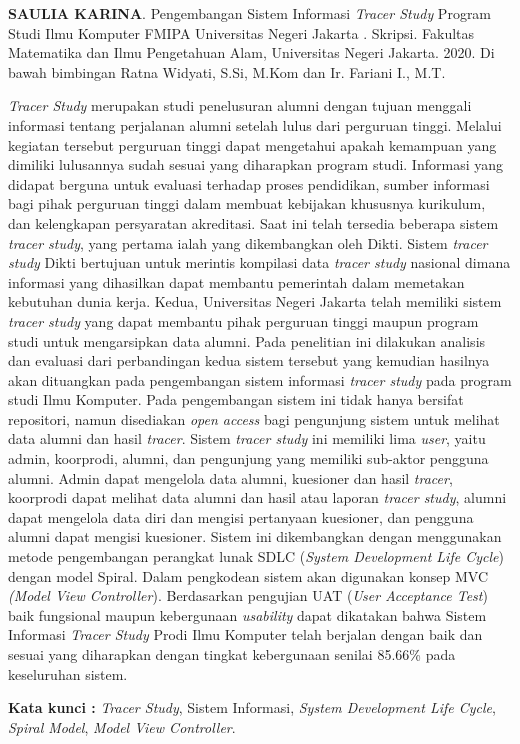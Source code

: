 \documentclass{jtetiskripsi}
\begin{document}
\begin{abstractind}
\textbf{SAULIA KARINA}. Pengembangan Sistem Informasi \textit{Tracer Study} Program Studi Ilmu Komputer FMIPA Universitas Negeri Jakarta . Skripsi. Fakultas Matematika dan Ilmu Pengetahuan Alam, Universitas Negeri Jakarta. 2020. Di bawah bimbingan Ratna Widyati, S.Si, M.Kom dan Ir. Fariani I., M.T.
\vskip1cm

\textit{Tracer Study} merupakan studi penelusuran alumni dengan tujuan menggali informasi tentang perjalanan alumni setelah lulus dari perguruan tinggi. Melalui kegiatan tersebut perguruan tinggi dapat mengetahui apakah kemampuan yang dimiliki lulusannya sudah sesuai yang diharapkan program studi. Informasi yang didapat berguna untuk evaluasi terhadap proses pendidikan, sumber informasi bagi pihak perguruan tinggi dalam membuat kebijakan khususnya kurikulum, dan kelengkapan persyaratan akreditasi. Saat ini telah tersedia beberapa sistem \textit{tracer study}, yang pertama ialah yang dikembangkan oleh Dikti. Sistem \textit{tracer study} Dikti bertujuan untuk merintis kompilasi data \textit{tracer study} nasional dimana informasi yang dihasilkan dapat membantu pemerintah dalam memetakan kebutuhan dunia kerja. Kedua, Universitas Negeri Jakarta telah memiliki sistem \textit{tracer study} yang dapat membantu pihak perguruan tinggi maupun program studi untuk mengarsipkan data alumni. Pada penelitian ini dilakukan analisis dan evaluasi dari perbandingan kedua sistem tersebut yang kemudian hasilnya akan dituangkan pada pengembangan sistem informasi \textit{tracer study} pada program studi Ilmu Komputer. Pada pengembangan sistem ini tidak hanya bersifat repositori, namun disediakan \textit{open access} bagi pengunjung sistem untuk melihat data alumni dan hasil \textit{tracer}. Sistem \textit{tracer study} ini memiliki lima \textit{user}, yaitu admin, koorprodi, alumni, dan pengunjung yang memiliki sub-aktor pengguna alumni. Admin dapat mengelola data alumni, kuesioner dan hasil \textit{tracer}, koorprodi dapat melihat data alumni dan hasil atau laporan \textit{tracer study}, alumni dapat mengelola data diri dan mengisi pertanyaan kuesioner, dan pengguna alumni dapat mengisi kuesioner. Sistem ini dikembangkan dengan menggunakan metode pengembangan perangkat lunak SDLC (\textit{System Development Life Cycle}) dengan model Spiral. Dalam pengkodean sistem akan digunakan konsep MVC \textit{(Model View Controller}). Berdasarkan pengujian UAT (\textit{User Acceptance Test}) baik fungsional maupun kebergunaan \textit{usability} dapat dikatakan bahwa Sistem Informasi \textit{Tracer Study} Prodi Ilmu Komputer telah berjalan dengan baik dan sesuai yang diharapkan dengan tingkat kebergunaan senilai 85.66\% pada keseluruhan sistem. 


\bigskip
\noindent
\textbf{Kata kunci :} \textit{Tracer Study}, Sistem Informasi, \textit{System Development Life Cycle}, \textit{Spiral Model}, \textit{Model View Controller}.

\end{abstractind}
\end{document}
